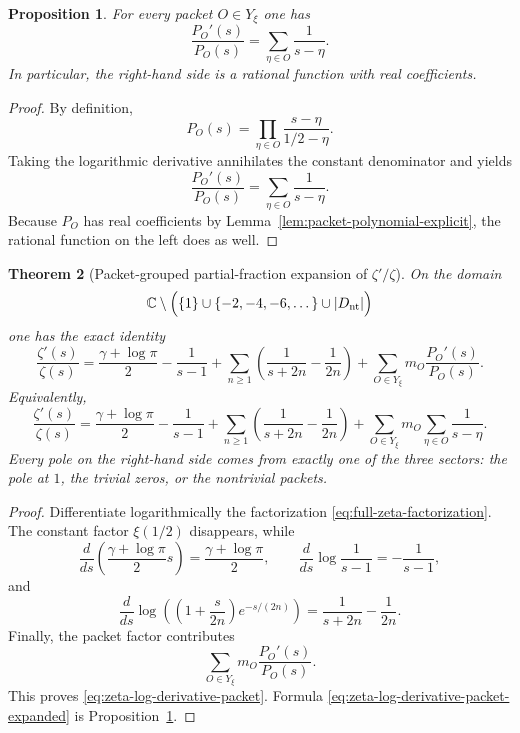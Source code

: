 \documentclass[11pt,a4paper]{article}
\numberwithin{equation}{section}
\newtheorem{theorem}{Theorem}[section]
\newtheorem{proposition}[theorem]{Proposition}
\theoremstyle{definition}
\theoremstyle{remark}
\newcommand{\CC}{\mathbb C}
\begin{document}
\begin{proposition}\label{prop:packet-log-derivative}
For every packet $O\in Y_\xi$ one has
\begin{equation}\label{eq:packet-log-derivative}
\frac{P_O'(s)}{P_O(s)}=\sum_{\eta\in O}\frac{1}{s-\eta}.
\end{equation}
In particular, the right-hand side is a rational function with real coefficients.
\end{proposition}

\begin{proof}
By definition,
\[
P_O(s)=\prod_{\eta\in O}\frac{s-\eta}{1/2-\eta}.
\]
Taking the logarithmic derivative annihilates the constant denominator and yields
\[
\frac{P_O'(s)}{P_O(s)}=\sum_{\eta\in O}\frac{1}{s-\eta}.
\]
Because $P_O$ has real coefficients by Lemma~\ref{lem:packet-polynomial-explicit}, the rational function on the left does as well.
\end{proof}

\begin{theorem}[Packet-grouped partial-fraction expansion of $\zeta'/\zeta$]\label{thm:zeta-log-derivative-packet}
On the domain
\[
\CC\setminus\Bigl(\{1\}\cup\{-2,-4,-6,\dots\}\cup |D_{\mathrm{nt}}|\Bigr)
\]
one has the exact identity
\begin{equation}\label{eq:zeta-log-derivative-packet}
\frac{\zeta'(s)}{\zeta(s)}
=
\frac{\gamma+\log\pi}{2}
-\frac{1}{s-1}
+\sum_{n\ge 1}\left(\frac{1}{s+2n}-\frac{1}{2n}\right)
+\sum_{O\in Y_\xi} m_O\frac{P_O'(s)}{P_O(s)}.
\end{equation}
Equivalently,
\begin{equation}\label{eq:zeta-log-derivative-packet-expanded}
\frac{\zeta'(s)}{\zeta(s)}
=
\frac{\gamma+\log\pi}{2}
-\frac{1}{s-1}
+\sum_{n\ge 1}\left(\frac{1}{s+2n}-\frac{1}{2n}\right)
+\sum_{O\in Y_\xi} m_O\sum_{\eta\in O}\frac{1}{s-\eta}.
\end{equation}
Every pole on the right-hand side comes from exactly one of the three sectors: the pole at $1$, the trivial zeros, or the nontrivial packets.
\end{theorem}

\begin{proof}
Differentiate logarithmically the factorization \eqref{eq:full-zeta-factorization}.  The constant factor $\xi(1/2)$ disappears, while
\[
\frac{d}{ds}\left(\frac{\gamma+\log\pi}{2}s\right)=\frac{\gamma+\log\pi}{2},
\qquad
\frac{d}{ds}\log\frac{1}{s-1}=-\frac{1}{s-1},
\]
and
\[
\frac{d}{ds}\log\left(\left(1+\frac{s}{2n}\right)e^{-s/(2n)}\right)
=\frac{1}{s+2n}-\frac{1}{2n}.
\]
Finally, the packet factor contributes
\[
\sum_{O\in Y_\xi} m_O\frac{P_O'(s)}{P_O(s)}.
\]
This proves \eqref{eq:zeta-log-derivative-packet}.  Formula \eqref{eq:zeta-log-derivative-packet-expanded} is Proposition~\ref{prop:packet-log-derivative}.
\end{proof}
\end{document}
